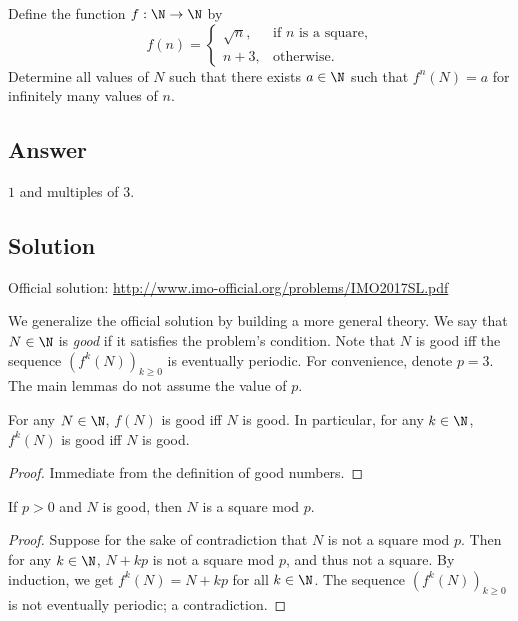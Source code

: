 Define the function $f : \N \to \N$ by
\[ f(n) = \begin{cases} \sqrt{n}, & \text{if $n$ is a square,} \\ n + 3, & \text{otherwise.} \end{cases} \]
Determine all values of $N$ such that there exists $a \in \N$ such that $f^n(N) = a$ for infinitely many values of $n$.



\subsection*{Answer}

$1$ and multiples of $3$.



\subsection*{Solution}

Official solution: \url{http://www.imo-official.org/problems/IMO2017SL.pdf}

We generalize the official solution by building a more general theory.
We say that $N \in \N$ is \emph{good} if it satisfies the problem's condition.
Note that $N$ is good iff the sequence $(f^k(N))_{k \geq 0}$ is eventually periodic.
For convenience, denote $p = 3$.
The main lemmas do not assume the value of $p$.

\begin{lemma}\label{2017n1-1}
For any $N \in \N$, $f(N)$ is good iff $N$ is good.
In particular, for any $k \in \N$, $f^k(N)$ is good iff $N$ is good.
\end{lemma}
\begin{proof}
Immediate from the definition of good numbers.
\end{proof}

\begin{lemma}\label{2017n1-2}
If $p > 0$ and $N$ is good, then $N$ is a square mod $p$.
\end{lemma}
\begin{proof}
Suppose for the sake of contradiction that $N$ is not a square mod $p$.
Then for any $k \in \N$, $N + kp$ is not a square mod $p$, and thus not a square.
By induction, we get $f^k(N) = N + kp$ for all $k \in \N$.
The sequence $(f^k(N))_{k \geq 0}$ is not eventually periodic; a contradiction.
\end{proof}

